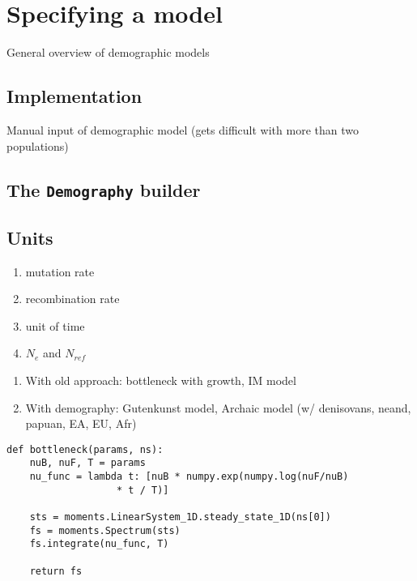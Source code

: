 \documentclass[11pt]{article}
\makeatletter
\newcommand{\py}[1]{\lstinline[breaklines=true,language=Python, showstringspaces=False]@#1@}
\makeatother
\begin{document}
\clearpage

\section{Specifying a model}

General overview of demographic models

\subsection{Implementation}

Manual input of demographic model (gets difficult with more than two populations)

\subsection{The \texttt{Demography} builder}

\subsection{Units}
\begin{enumerate}
\item mutation rate
\item recombination rate
\item unit of time
\item $N_e$ and $N_{ref}$
\end{enumerate}

\clearpage
\begin{enumerate}
\item With old approach: bottleneck with growth, IM model
\item With demography: Gutenkunst model, Archaic model (w/ denisovans, neand, papuan, EA, EU, Afr)
\end{enumerate}


\begin{lstlisting}[caption={\textbf{Bottleneck:} At time \py{TF} + \py{TB} in the past, an equilibrium population goes through a bottleneck of depth \py{nuB}, recovering to relative size \py{nuF}.}, float, label={lst:bottleneck}]
def bottleneck(params, ns):
    nuB, nuF, T = params
    nu_func = lambda t: [nuB * numpy.exp(numpy.log(nuF/nuB) 
    			   * t / T)]

    sts = moments.LinearSystem_1D.steady_state_1D(ns[0])
    fs = moments.Spectrum(sts)
    fs.integrate(nu_func, T)

    return fs
\end{lstlisting}
\end{document}
